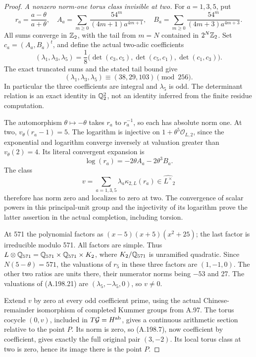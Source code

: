\begin{proof}
\emph{A nonzero norm-one torus class invisible at two.}
For \(a=1,3,5\), put
\[
 r_a=\frac{a-\theta}{a+\theta},\quad
 A_a=\sum_{m\geq0}\frac{54^m}{(4m+1)a^{4m+1}},\quad
 B_a=\sum_{m\geq0}\frac{54^m}{(4m+3)a^{4m+3}}.
\tag{A.198.17}
\]
All sums converge in \(\mathbb Z_2\), with the tail from \(m=N\)
contained in \(2^N\mathbb Z_2\).  Set \(c_a=(A_a,B_a)^t\), and
define the actual two-adic coefficients
\[
 (\lambda_1,\lambda_3,\lambda_5)
 =\frac18\bigl(\det(c_3,c_5),\det(c_5,c_1),\det(c_1,c_3)\bigr).
\tag{A.198.18}
\]
The exact truncated sums and the stated tail bound give
\[
      (\lambda_1,\lambda_3,\lambda_5)
                      \equiv(38,29,103)\pmod{256}.
\tag{A.198.19}
\]
In particular the three coefficients are integral and
\(\lambda_5\) is odd.  The determinant relation is an exact
identity in \(\mathbb Q_2^2\), not an identity inferred from the
finite residue computation.

The automorphism \(\theta\mapsto-\theta\) takes \(r_a\)
to \(r_a^{-1}\), so each has absolute norm one.
At two, \(v_\theta(r_a-1)=5\).  The logarithm is injective
on \(1+\theta^5\mathcal O_{L,2}\), since the exponential
and logarithm converge inversely at valuation greater than
\(v_\theta(2)=4\).  Its literal convergent expansion is
\[
                \log(r_a)=-2\theta A_a-2\theta^3B_a.
\tag{A.198.20}
\]
The class
\[
                 v=\sum_{a=1,3,5}\lambda_a\kappa_{2,L}(r_a)
                     \in\widehat{L^\times}_2
\tag{A.198.21}
\]
therefore has norm zero and localizes to zero at two.
The convergence of scalar powers in this principal-unit group
and the injectivity of its logarithm prove the latter assertion
in the actual completion, including torsion.

At 571 the polynomial factors as
\((x-5)(x+5)(x^2+25)\); the last factor is irreducible modulo
571.  All factors are simple.  Thus
\(L\otimes\mathbb Q_{571}=\mathbb Q_{571}\times\mathbb Q_{571}\times K_2\),
where \(K_2/\mathbb Q_{571}\) is unramified quadratic.
Since \(N(5-\theta)=571\), the valuations of \(r_5\)
in these three factors are \((1,-1,0)\).
The other two ratios are units there, their numerator norms
being \(-53\) and 27.  The valuations of (A.198.21) are
\((\lambda_5,-\lambda_5,0)\), so \(v\ne0\).

Extend \(v\) by zero at every odd coefficient prime, using the
actual Chinese-remainder isomorphism of completed Kummer groups
from A.97.  The torus cocycle \((0,v)\), included in
\(T\mathcal G=H^{\rm ab}\), gives a continuous arithmetic
section relative to the point \(P\).  Its norm is zero, so
(A.198.7), now coefficient by coefficient, gives exactly the
full original pair \((3,-2)\).  Its local torus class at two
is zero, hence its image there is the point \(P\).


\end{proof}
